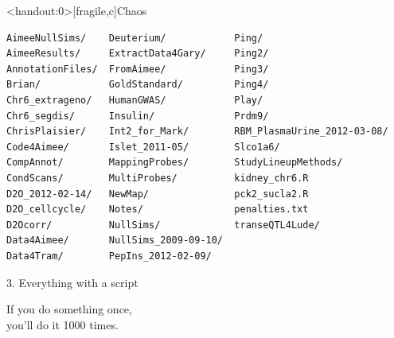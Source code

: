 \documentclass[12pt,t]{beamer}
\begin{document}
\begin{frame}<handout:0>[fragile,c]{Chaos}

\addtocounter{framenumber}{-1}

\begin{center}
\begin{minipage}[c]{11.33cm}
\begin{semiverbatim}
\lstset{basicstyle=\scriptsize}
\begin{lstlisting}[linewidth=11.33cm]
AimeeNullSims/    Deuterium/            Ping/
AimeeResults/     ExtractData4Gary/     Ping2/
AnnotationFiles/  FromAimee/            Ping3/
Brian/            GoldStandard/         Ping4/
Chr6_extrageno/   HumanGWAS/            Play/
Chr6_segdis/      Insulin/              Prdm9/
ChrisPlaisier/    Int2_for_Mark/        RBM_PlasmaUrine_2012-03-08/
Code4Aimee/       Islet_2011-05/        Slco1a6/
CompAnnot/        MappingProbes/        StudyLineupMethods/
CondScans/        MultiProbes/          kidney_chr6.R
D2O_2012-02-14/   NewMap/               pck2_sucla2.R
D2O_cellcycle/    Notes/                penalties.txt
D2Ocorr/          NullSims/             transeQTL4Lude/
Data4Aimee/       NullSims_2009-09-10/
Data4Tram/        PepIns_2012-02-09/
\end{lstlisting}
\end{semiverbatim}
\end{minipage}
\end{center}

\end{frame}


\begin{frame}[c]{3. Everything with a script}

\centering
\large
If you do something once, \\
you'll do it 1000 times.

\end{frame}
\end{document}
